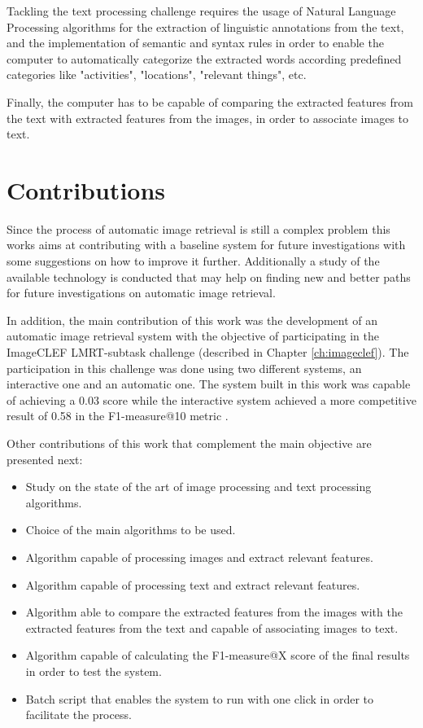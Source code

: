 Tackling the text processing challenge requires the usage of Natural Language Processing algorithms for the extraction of  linguistic annotations from the text, and the implementation of semantic and syntax rules in order to enable the computer to automatically categorize the extracted words according predefined categories like "activities", "locations", "relevant things", etc. 


Finally, the computer has to be capable of comparing the extracted features from the text with extracted features from the images, in order to associate images to text.

\section{Contributions}

Since the process of automatic image retrieval is still a complex problem this works aims at contributing with a baseline system for future investigations with some suggestions on how to improve it further. Additionally a study of the available technology is conducted that may help on finding new and better paths for future investigations on automatic image retrieval.

In addition, the main contribution of this work was the development of an automatic image retrieval system with the objective of participating in the ImageCLEF LMRT-subtask challenge (described in Chapter \ref{ch:imageclef}).
The participation in this challenge was done using two different systems, an interactive one and an automatic one. The system built in this work was capable of achieving a 0.03 score while the interactive system achieved a more competitive result of 0.58 in the F1-measure@10 metric \cite{Ribeiro2020}.


Other contributions of this work that complement the main objective are presented next:

\begin{itemize}
    \item Study on the state of the art of image processing and text processing algorithms.
    \item Choice of the main algorithms to be used.
    \item Algorithm capable of processing images and extract relevant features.
    \item Algorithm capable of processing text and extract relevant features.
    \item Algorithm able to compare the extracted features from the images with the extracted features from the text and capable of associating images to text.
    \item Algorithm capable of calculating the F1-measure@X score of the final results in order to test the system.
    \item Batch script that enables the system to run with one click in order to facilitate the process.
  \end{itemize}



